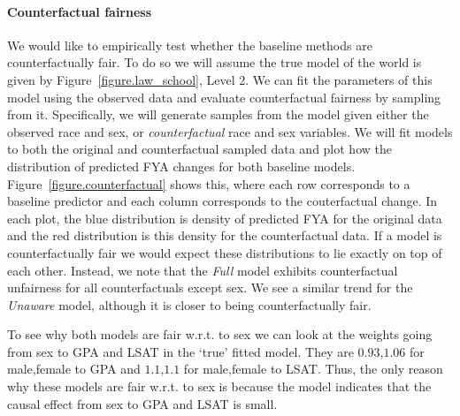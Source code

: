 \paragraph{Counterfactual fairness}
We would like to empirically test whether the baseline methods are counterfactually fair. To do so we will assume the true model of the world is given by Figure~\ref{figure.law_school}, Level 2. We can fit the parameters of this model using the observed data and evaluate counterfactual fairness by sampling from it. Specifically, we will generate samples from the model given either the observed race and sex, or \emph{counterfactual} race and sex variables. We will fit models to both the original and counterfactual sampled data and plot how the distribution of predicted FYA changes for both baseline models. Figure~\ref{figure.counterfactual} shows this, where each row corresponds to a baseline predictor and each column corresponds to the couterfactual change. In each plot, the blue distribution is density of predicted FYA for the original data and the red distribution is this density for the counterfactual data. If a model is counterfactually fair we would expect these distributions to lie exactly on top of each other. Instead, we note that the \emph{Full} model exhibits counterfactual unfairness for all counterfactuals except sex. We see a similar trend for the \emph{Unaware} model, although it is closer to being counterfactually fair.

To see why both models are fair w.r.t. to sex we can look at the weights going from sex to GPA and LSAT in the `true' fitted model. They are $0.93$,$1.06$ for male,female to GPA and $1.1$,$1.1$ for male,female to LSAT. Thus, the only reason why these models are fair w.r.t. to sex is because the model indicates that the causal effect from sex to GPA and LSAT is small.


 


